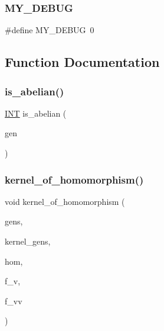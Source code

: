 \subsubsection{\texorpdfstring{M\+Y\+\_\+\+D\+E\+B\+UG}{MY\_DEBUG}}
{\footnotesize\ttfamily \#define M\+Y\+\_\+\+D\+E\+B\+UG~0}



\subsection{Function Documentation}
\mbox{\label{perm__group__gens_8_c_ac0291199b2706f0eb554ae24d2e7cefc}} 
\subsubsection{\texorpdfstring{is\+\_\+abelian()}{is\_abelian()}}
{\footnotesize\ttfamily \mbox{\hyperlink{galois_8h_a09fddde158a3a20bd2dcadb609de11dc}{I\+NT}} is\+\_\+abelian (\begin{DoxyParamCaption}\item[{\mbox{\hyperlink{class_vector}{Vector}} \&}]{gen }\end{DoxyParamCaption})}

\mbox{\label{perm__group__gens_8_c_a13788b99964245e11ec79a47adaa667b}} 
\subsubsection{\texorpdfstring{kernel\+\_\+of\+\_\+homomorphism()}{kernel\_of\_homomorphism()}}
{\footnotesize\ttfamily void kernel\+\_\+of\+\_\+homomorphism (\begin{DoxyParamCaption}\item[{\mbox{\hyperlink{class_vector}{Vector}} \&}]{gens,  }\item[{\mbox{\hyperlink{class_vector}{Vector}} \&}]{kernel\+\_\+gens,  }\item[{void($\ast$)(\mbox{\hyperlink{classdiscreta__base}{discreta\+\_\+base}} \&\mbox{\hyperlink{alphabet2_8_c_a6150e0515f7202e2fb518f7206ed97dc}{x}}, \mbox{\hyperlink{classdiscreta__base}{discreta\+\_\+base}} \&image)}]{hom,  }\item[{\mbox{\hyperlink{galois_8h_a09fddde158a3a20bd2dcadb609de11dc}{I\+NT}}}]{f\+\_\+v,  }\item[{\mbox{\hyperlink{galois_8h_a09fddde158a3a20bd2dcadb609de11dc}{I\+NT}}}]{f\+\_\+vv }\end{DoxyParamCaption})}


